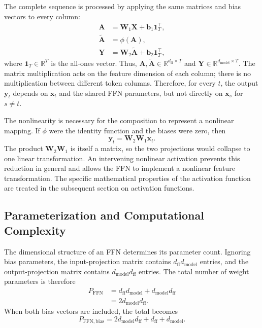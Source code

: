The complete sequence is processed by applying the same matrices and bias
vectors to every column:
\begin{align}
    \mathbf{A}
    &=
    \mathbf{W}_1\mathbf{X}
    +\mathbf{b}_1\mathbf{1}_T^{\top},
    \label{eq:ffn-batch-first}\\
    \widetilde{\mathbf{A}}
    &=
    \phi(\mathbf{A}),
    \label{eq:ffn-batch-activation}\\
    \mathbf{Y}
    &=
    \mathbf{W}_2\widetilde{\mathbf{A}}
    +\mathbf{b}_2\mathbf{1}_T^{\top},
    \label{eq:ffn-batch-second}
\end{align}
where \(\mathbf{1}_T\in\mathbb{R}^{T}\) is the all-ones vector. Thus,
\(\mathbf{A},\widetilde{\mathbf{A}}\in
\mathbb{R}^{d_{\mathrm{ff}}\times T}\) and
\(\mathbf{Y}\in\mathbb{R}^{d_{\mathrm{model}}\times T}\).
The matrix multiplication acts on the feature dimension of each column;
there is no multiplication between different token columns. Therefore,
for every \(t\), the output \(\mathbf{y}_t\) depends on
\(\mathbf{x}_t\) and the shared FFN parameters, but not directly on
\(\mathbf{x}_{s}\) for \(s\ne t\).

The nonlinearity is necessary for the composition to represent a
nonlinear mapping. If \(\phi\) were the identity function and the biases
were zero, then
\[
    \mathbf{y}_t
    =
    \mathbf{W}_2\mathbf{W}_1\mathbf{x}_t.
\]
The product \(\mathbf{W}_2\mathbf{W}_1\) is itself a matrix, so the two
projections would collapse to one linear transformation. An intervening
nonlinear activation prevents this reduction in general and allows the
FFN to implement a nonlinear feature transformation. The specific
mathematical properties of the activation function are treated in the
subsequent section on activation functions.

\subsection{Parameterization and Computational Complexity}
\label{subsec:ffn-parameters-complexity}

The dimensional structure of an FFN determines its parameter count.
Ignoring bias parameters, the input-projection matrix contains
\(d_{\mathrm{ff}}d_{\mathrm{model}}\) entries, and the output-projection
matrix contains \(d_{\mathrm{model}}d_{\mathrm{ff}}\) entries. The total
number of weight parameters is therefore
\begin{align}
    P_{\mathrm{FFN}}
    &=
    d_{\mathrm{ff}}d_{\mathrm{model}}
    +d_{\mathrm{model}}d_{\mathrm{ff}}\\
    &=
    2d_{\mathrm{model}}d_{\mathrm{ff}}.
    \label{eq:ffn-parameter-count}
\end{align}
When both bias vectors are included, the total becomes
\begin{equation}
    P_{\mathrm{FFN,bias}}
    =
    2d_{\mathrm{model}}d_{\mathrm{ff}}
    +d_{\mathrm{ff}}+d_{\mathrm{model}}.
    \label{eq:ffn-parameter-count-bias}
\end{equation}

